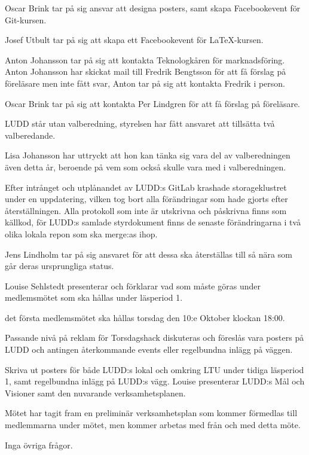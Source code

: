 \documentclass{protokoll}
\begin{document}
Oscar Brink tar på sig ansvar att designa posters, samt skapa Facebookevent för
Git-kursen. 


Josef Utbult tar på sig att skapa ett Facebookevent för LaTeX-kursen.


Anton Johansson tar på sig att kontakta Teknologkåren för marknadsföring.
Anton Johansson har skickat mail till Fredrik Bengtsson för att få förslag på
föreläsare men inte fått svar, Anton tar på sig att kontakta Fredrik i person.


Oscar Brink tar på sig att kontakta Per Lindgren för att få förslag på
föreläsare. 

LUDD står utan valberedning, styrelsen har fått ansvaret att tillsätta två
valberedande. 


Lisa Johansson har uttryckt att hon kan tänka sig vara del av valberedningen
även detta år, beroende på vem som också skulle vara med i valberedningen. 

Efter intrånget och utplånandet av LUDD:s GitLab krashade storageklustret under
en uppdatering, vilken tog bort alla förändringar som hade gjorts efter
återställningen. Alla protokoll som inte är utskrivna och påskrivna finns som
källkod, för LUDD:s samlade styrdokument finns de senaste förändringarna i två
olika lokala repon som ska merge:as ihop. 


Jens Lindholm tar på sig ansvaret för att dessa ska återställas till så nära
som går deras ursprungliga status. 

Louise Sehlstedt presenterar och förklarar vad som måste göras under
medlemsmötet som ska hållas under läsperiod 1. 

\begin{beslut}
  \att det första medlemsmötet ska hållas torsdag den 10:e Oktober klockan
  18:00.
\end{beslut}
Passande nivå på reklam för Torsdagshack diskuteras och föreslås vara posters 
på LUDD och antingen återkommande events eller regelbundna inlägg på väggen. 


Skriva ut posters för både LUDD:s lokal och omkring LTU under tidiga läsperiod
1, samt regelbundna inlägg på LUDD:s vägg. 
Louise presenterar LUDD:s Mål och Visioner samt den nuvarande verksamhetsplanen.  

Mötet har tagit fram en preliminär verksamhetsplan som kommer förmedlas till
medlemmarna under mötet, men kommer arbetas med från och med detta möte.

Inga övriga frågor.
\end{document}
